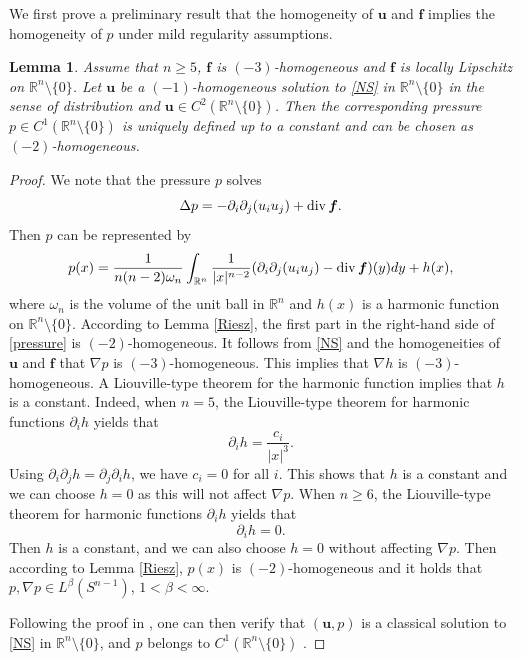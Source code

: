 \documentclass[12pt]{amsart}
\newtheorem{lemma}[theorem]{Lemma}
\renewcommand{\div}{{\rm div \thinspace }}
\newcommand{\Bu}{{\boldsymbol{u}}}
\newcommand{\Bf}{{\boldsymbol{f}}}
\begin{document}
	We first prove a preliminary result that the homogeneity of $\Bu$ and $\Bf$  implies the homogeneity of $p$ under mild regularity assumptions.
	\begin{lemma}\label{Lemmapressure} Assume that $n\geq 5$,  $\Bf$ is $(-3)$-homogeneous and $\Bf$ is locally Lipschitz on $\mathbb{R}^n \setminus \{0\}$. 
		Let $\Bu$ be a $(-1)$-homogeneous solution to \eqref{NS} in $\mathbb{R}^n \setminus \{0\}$ in the sense of distribution and $\Bu \in C^2(\mathbb{R}^n \setminus \{0\})$.
		Then the corresponding pressure $p\in C^1(\mathbb{R}^n \setminus\{0\})$ is uniquely defined up to a constant and can be chosen as $(-2)$-homogeneous.
	\end{lemma}
	\begin{proof}		
		We note that the pressure $p$ solves
		\begin{equation*}
			\Delta p =- \partial_i\partial_j(u_iu_j)+ \div \Bf.
		\end{equation*}
		Then $p$ can be represented by 
		\begin{equation}\label{pressure}
			p(x) = \frac{1}{n(n-2) \omega_n} \int_{\mathbb{R}^n}\frac{1}{|x|^{n-2}} (\partial_i\partial_j(u_iu_j)- \div \Bf )(y) dy + h(x),
		\end{equation}
		where $\omega_n$  is the volume of the unit ball in $\mathbb{R}^n$ and $h(x)$ is a harmonic function on $\mathbb{R}^n\setminus\{0\}$.
		According to Lemma \ref{Riesz}, the first part in the right-hand side of \eqref{pressure}  is $(-2)$-homogeneous. It follows from \eqref{NS} and the homogeneities of $\Bu$ and $\Bf$ that $\nabla p$ is $(-3)$-homogeneous. This implies that $\nabla h$ is $(-3)$-homogeneous. A Liouville-type theorem for the harmonic function implies that $h$ is a constant. Indeed, when $n= 5$, the Liouville-type theorem for harmonic functions $\partial_i h$ yields that 
		\begin{equation*}
			\partial_i h= \frac{c_i}{|x|^3}.
		\end{equation*}
		Using $\partial_i \partial_j h= \partial_j \partial_i h$, we have
		$c_i=0$ for all $i$. This shows that $h$ is a constant and we can choose $h=0$ as this will not affect $\nabla p$. When $n\geq 6$, the Liouville-type theorem for harmonic functions $\partial_i h$ yields that 
		\begin{equation*}
			\partial_i h= 0.
		\end{equation*}
		Then $h$ is a constant, and we can also choose $h=0$ without affecting $\nabla p$.       
		Then according to Lemma \ref{Riesz}, $p(x)$ is $(-2)$-homogeneous and it holds that $p, \nabla p \in L^\beta(S^{n-1})$, $1<\beta< \infty$.
		
		Following the proof in \cite{Galdi11}, one can then verify that $(\Bu, p)$ is a classical solution to \eqref{NS} in $\mathbb{R}^n \setminus \{0\}$, and $p$ belongs to $C^1(\mathbb{R}^n \setminus\{0\})$ . 
	\end{proof}
	
\end{document}
